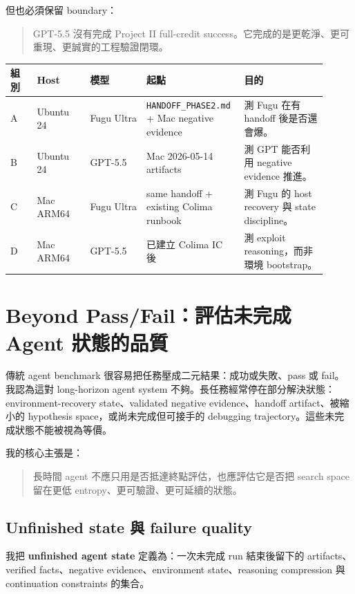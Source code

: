 \documentclass[UTF8,a4paper,11pt]{ctexart}
\newcommand{\artifact}[1]{\texttt{#1}}
\newcommand{\finding}[1]{\textbf{#1}}
\begin{document}
但也必須保留 boundary：

\begin{quote}
GPT-5.5 沒有完成 Project II full-credit success。它完成的是更乾淨、更可重現、更誠實的工程驗證閉環。
\end{quote}

\begin{longtable}{L{0.08\linewidth} L{0.16\linewidth} L{0.17\linewidth} L{0.25\linewidth} L{0.25\linewidth}}
\toprule
組別 & Host & 模型 & 起點 & 目的\\
\midrule
A & Ubuntu 24 & Fugu Ultra & \artifact{HANDOFF\_PHASE2.md} + Mac negative evidence & 測 Fugu 在有 handoff 後是否還會爆。\\
B & Ubuntu 24 & GPT-5.5 & Mac 2026-05-14 artifacts & 測 GPT 能否利用 negative evidence 推進。\\
C & Mac ARM64 & Fugu Ultra & same handoff + existing Colima runbook & 測 Fugu 的 host recovery 與 state discipline。\\
D & Mac ARM64 & GPT-5.5 & 已建立 Colima IC 後 & 測 exploit reasoning，而非環境 bootstrap。\\
\bottomrule
\end{longtable}

\section{Beyond Pass/Fail：評估未完成 Agent 狀態的品質}

傳統 agent benchmark 很容易把任務壓成二元結果：成功或失敗、pass 或 fail。我認為這對 long-horizon agent system 不夠。長任務經常停在部分解決狀態：environment-recovery state、validated negative evidence、handoff artifact、被縮小的 hypothesis space，或尚未完成但可接手的 debugging trajectory。這些未完成狀態不能被視為等價。

我的核心主張是：

\begin{quote}
長時間 agent 不應只用是否抵達終點評估，也應評估它是否把 search space 留在更低 entropy、更可驗證、更可延續的狀態。
\end{quote}

\subsection{Unfinished state 與 failure quality}

我把 \finding{unfinished agent state} 定義為：一次未完成 run 結束後留下的 artifacts、verified facts、negative evidence、environment state、reasoning compression 與 continuation constraints 的集合。
\end{document}
